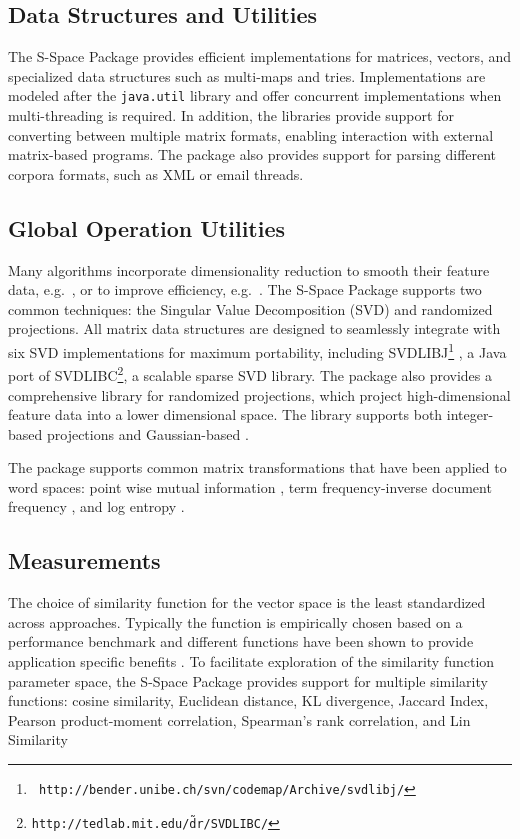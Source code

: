 \subsection{Data Structures and Utilities}

The S-Space Package provides efficient implementations for matrices, vectors,
and specialized data structures such as multi-maps and tries.  Implementations
are modeled after the {\tt \footnotesize java.util} library and offer concurrent
implementations when multi-threading is required.  In addition, the libraries
provide support for converting between multiple matrix formats, enabling
interaction with external matrix-based programs.  The package also provides
support for parsing different corpora formats, such as XML or email threads.

\subsection{Global Operation Utilities}

Many algorithms incorporate dimensionality reduction to smooth their feature
data, e.g.\ \cite{landauer97solution,rohde09improved}, or to improve efficiency,
e.g.\ \cite{sahlgren08permutations,jones06high}.  The S-Space Package supports
two common techniques: the Singular Value Decomposition (SVD) and randomized
projections.  All matrix data structures are designed to seamlessly integrate
with six SVD implementations for maximum portability, including
SVDLIBJ\footnote{\texttt{\scriptsize
    http://bender.unibe.ch/svn/codemap/Archive/svdlibj/}} , a Java port of
SVDLIBC\footnote{\texttt{\scriptsize http://tedlab.mit.edu/\~dr/SVDLIBC/}}, a
scalable sparse SVD library.  The package also provides a comprehensive library
for randomized projections, which project high-dimensional feature data into a
lower dimensional space.  The library supports both integer-based projections
\cite{kanerva00random} and Gaussian-based \cite{jones06high}.

The package supports common matrix transformations that have been applied to
word spaces: point wise mutual information \cite{lin98automatic}, term
frequency-inverse document frequency \cite{salton88term},
and log entropy
\cite{landauer97solution}.

\subsection{Measurements}

The choice of similarity function for the vector space is the least standardized
across approaches.  Typically the function is empirically chosen based on a
performance benchmark and different functions have been shown to provide
application specific benefits \cite{weeds04characterising}.
To facilitate exploration of the similarity function parameter space, the
S-Space Package provides support for multiple similarity functions: cosine
similarity, Euclidean distance, KL divergence, Jaccard Index, Pearson
product-moment correlation, Spearman's rank correlation, and Lin Similarity
\cite{lin98automatic}

